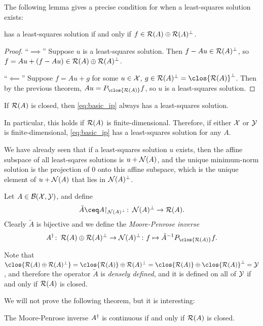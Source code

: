 The following lemma gives a precise condition for when a least-squares solution exists: 
\begin{lemma}
     has a least-squares solution if and only if $f \in \operatorname{\mathcal R}(A) \oplus \operatorname{\mathcal R}(A)^\perp$. 
\end{lemma}

\begin{proof}
    ``$\implies$'' Suppose $u$ is a least-squares solution. Then $f - Au \in \operatorname{\mathcal R}(A)^\perp$, so $f = Au + (f - Au) \in \operatorname{\mathcal R}(A) \oplus \operatorname{\mathcal R}(A)^\perp$.
    
    ``$\impliedby$'' Suppose $f = Au + g$ for some $u \in \mathcal X$, $g \in \Ran(A)\P = \clos{\Ran(A)}\P$. Then by the previous theorem, $Au = P_{\clos{\Ran(A)}}f$, so $u$ is a least-squares solution. 
\end{proof}

\begin{corollary}
    If $\operatorname{\mathcal R}(A)$ is closed, then \cref{eq:basic_ip} always has a least-squares solution. 
\end{corollary}
In particular, this holds if $\operatorname{\mathcal R}(A)$ is finite-dimensional. Therefore, if either $\mathcal X$ or $\mathcal Y$ is finite-dimensional, \cref{eq:basic_ip} has a least-squares solution for any $A$. 

We have already seen that if a least-squares solution $u$ exists, then the affine subspace of all least-sqares solutions is $u + \operatorname{\mathcal N}(A)$, and the unique minimum-norm solution is the projection of 0 onto this affine subspace, which is the unique element of $u + \operatorname{\mathcal N}(A)$ that lies in $\operatorname{\mathcal N}(A)^\perp$. 

\begin{definition}
    Let $A \in \mathcal B(\mathcal X, \mathcal Y)$, and define
    \[
    \tilde A \ceq A \restr_{\Nul(A)\P} \colon \Nul(A)\P \to \Ran(A). 
    \]
    Clearly $\tilde A$ is bijective and we define the \emph{Moore-Penrose inverse} 
    \[
    A\D \colon \Ran(A) \oplus \Ran(A)\P \to \Nul(A)\P \colon f \mapsto \tilde A^{-1} P_{\clos{\Ran(A)}} f. 
    \]
\end{definition}

\begin{remark}
    Note that $\clos{\Ran(A) \oplus \Ran(A)\P} = \clos{\Ran(A)} \oplus \Ran(A)\P = \clos{\Ran(A)} \oplus \clos{\Ran(A)}\P = \YY$, and therefore the operator $\tilde A$ is \emph{densely defined}, and it is defined on all of $
    \mathcal Y$ if and only if $\operatorname{\mathcal R}(A)$ is closed. 
\end{remark}

We will not prove the following theorem, but it is interesting: 
\begin{theorem} \label{thm:mp_inverse_continuous}
    The Moore-Penrose inverse $A^\dagger$ is continuous if and only if $\operatorname{\mathcal R}(A)$ is closed. 
\end{theorem}

